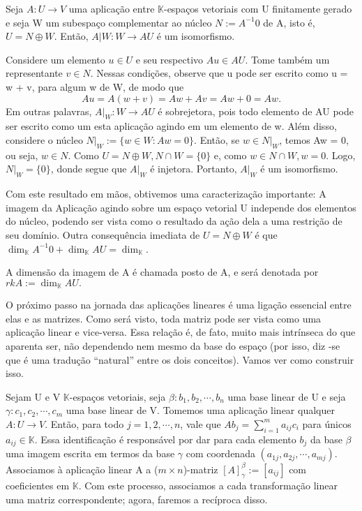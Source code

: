 \begin{proposition*}
    Seja $A:U\rightarrow{V}$ uma aplica\c c\~ao entre $\mathbb{K}$-espa\c cos vetoriais com U finitamente gerado e 
    seja W um subespa\c co complementar ao n\'ucleo $N:= A^{-1}0$ de A, isto \'e, $U = N \oplus W$. Ent\~ao, 
    $A|W: W \rightarrow AU$ \'e um isomorfismo.
\end{proposition*}
\begin{proof*}
    Considere um elemento $u\in{U}$ e seu respectivo $Au\in{AU}$. Tome tamb\'em um representante $v\in{N}$. Nessas
    condi\c c\~oes, observe que u pode ser escrito como u = w + v, para algum w de W, de modo que 
    $$
        Au = A(w + v) = Aw + Av = Aw + 0 = Aw.
    $$
    Em outras palavras, $A|_W: W\rightarrow AU$ \'e sobrejetora, pois todo elemento de AU pode ser escrito como
    um esta aplica\c c\~ao agindo em um elemento de w. Al\'em disso, considere o n\'ucleo $N|_W:=\{w\in{W}: Aw = 0\}.$
    Ent\~ao, se $w\in{N|_W}$, temos Aw = 0, ou seja, $w\in{N}.$ Como $U = N\oplus{W}, N\cap{W} = \{0\}$ e, como 
    $w\in{N\cap{W}}, w = 0.$ Logo, $N|_W = \{0\}$, donde segue que $A|_W$ \'e injetora. Portanto, $A|_W$ \'e um
    isomorfismo.
    \qedsymbol 
\end{proof*}
    Com este resultado em m\~aos, obtivemos uma caracteriza\c c\~ao importante: A imagem da Aplica\c c\~ao agindo
sobre um espa\c co vetorial U independe dos elementos do n\'ucleo, podendo ser vista como o resultado da a\c c\~ao
dela a uma restri\c c\~ao de seu dom\'inio. Outra consequ\^encia imediata de $U = N \oplus{W}$ \'e que 
$\dim_{\mathbb{K}}A^{-1}0 + \dim_{\mathbb{K}} AU = \dim_{\mathbb{K}}$.
\begin{def*}
    A dimens\~ao da imagem de A \'e chamada posto de A, e ser\'a denotada por $rkA:=\dim_{\mathbb{K}}AU.$
\end{def*}
    O pr\'oximo passo na jornada das aplica\c c\~oes lineares \'e uma liga\c c\~ao essencial entre elas e as matrizes.
Como ser\'a visto, toda matriz pode ser vista como uma aplica\c c\~ao linear e vice-versa. Essa rela\c c\~ao \'e,
de fato, muito mais intr\'inseca do que aparenta ser, n\~ao dependendo nem mesmo da base do espa\c co (por isso, diz
-se que \'e uma tradu\c c\~ao ``natural'' entre os dois conceitos). Vamos ver como construir isso.

    Sejam U e V $\mathbb{K}$-espa\c cos vetoriais, seja $\beta: b_1, b_2, \cdots, b_n$ uma base linear de U e seja 
$\gamma: c_1, c_2, \cdots, c_m$ uma base linear de V. Tomemos uma aplica\c c\~ao linear qualquer $A: U \rightarrow{V}$.
Ent\~ao, para todo $j = 1, 2, \cdots, n$, vale que $Ab_j = \sum\limits_{i=1}^{m}a_{ij}c_i$ para \'unicos $a_{ij}\in\mathbb{K}$.
Essa identifica\c c\~ao \'e respons\'avel por dar para cada elemento $b_j$ da base $\beta$ uma imagem escrita em termos
da base $\gamma$ com coordenada $(a_{1j}, a_{2j}, \cdots, a_{mj})$. Associamos \`a aplica\c c\~ao linear A a 
($m \times n$)-matriz $[A]_{\gamma}^{\beta}:=[a_{ij}]$ com coeficientes em $\mathbb{K}$. Com este processo, 
associamos a cada transforma\c c\~ao linear uma matriz correspondente; agora, faremos a rec\'iproca disso.

